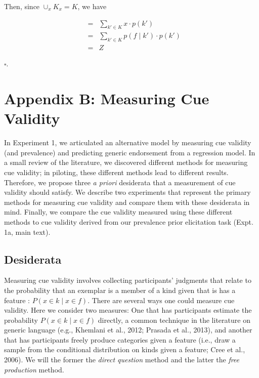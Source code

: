 \documentclass[english,floatsintext,man]{apa6}
\theoremstyle{definition}
\theoremstyle{definition}
\theoremstyle{definition}
\theoremstyle{remark}
\begin{document}
Then, since \(\cup_{x}{K_x} = K\), we have

\begin{eqnarray} \label{eq:partition}
  & = & \sum\limits_{k' \in K} x \cdot p( k') \nonumber \\ 
  & = & \sum\limits_{k' \in K} p(f \mid k') \cdot p( k') \nonumber \\ 
  & = & Z
\end{eqnarray}

\(\square.\)

\newpage

\section{Appendix B: Measuring Cue
Validity}\label{appendix-b-measuring-cue-validity}

In Experiment 1, we articulated an alternative model by measuring cue
validity (and prevalence) and predicting generic endorsement from a
regression model. In a small review of the literature, we discovered
different methods for measuring cue validity; in piloting, these
different methods lead to different results. Therefore, we propose three
\emph{a priori} desiderata that a measurement of cue validity should
satisfy. We describe two experiments that represent the primary methods
for measuring cue validity and compare them with these desiderata in
mind. Finally, we compare the cue validity measured using these
different methods to cue validity derived from our prevalence prior
elicitation task (Expt. 1a, main text).

\subsection{Desiderata}\label{desiderata}

Measuring cue validity involves collecting participants' judgments that
relate to the probability that an exemplar is a member of a kind given
that is has a feature : \(P(x \in k \mid x \in f)\). There are several
ways one could measure cue validity. Here we consider two measures: One
that has participants estimate the probability
\(P(x \in k \mid x \in f)\) directly, a common technique in the
literature on generic language (e.g., Khemlani et al., 2012; Prasada et
al., 2013), and another that has participants freely produce categories
given a feature (i.e., draw a sample from the conditional distribution
on kinds given a feature; Cree et al., 2006). We will the former the
\emph{direct question} method and the latter the \emph{free production}
method.
\end{document}
